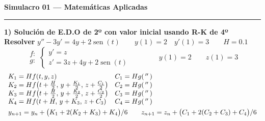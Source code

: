 \documentclass[11pt]{article}
\DeclareMathOperator{\sen}{sen}
\begin{document}
\begin{center}{\Large\textbf{Simulacro 01 --- Matemáticas Aplicadas}}\end{center}
\hrule\vspace{8pt}

{\large\textbf{1) Solución de E.D.O de 2º con valor inicial usando R-K de 4º}}\\[6pt]
\textbf{Resolver} \quad $y''-3y'=4y+2\sen(t) \qquad y(1)=2 \quad y'(1)=3 \qquad H=0.1$\\[4pt]
\[
\begin{array}{r} f:\\[2pt] g:\end{array}\left\{\begin{array}{l} y'=z\\[2pt] z'=3z+4y+2\sen(t)\end{array}\right.
\qquad\qquad y(1)=2 \qquad z(1)=3
\]
\[
\begin{array}{ll}
K_1=Hf(t,y,z) & C_1=Hg(\,''\,)\\
K_2=Hf\!\left(t+\frac{H}{2},\,y+\frac{K_1}{2},\,z+\frac{C_1}{2}\right) & C_2=Hg(\,''\,)\\
K_3=Hf\!\left(t+\frac{H}{2},\,y+\frac{K_2}{2},\,z+\frac{C_2}{2}\right) & C_3=Hg(\,''\,)\\
K_4=Hf(t+H,\,y+K_3,\,z+C_3) & C_4=Hg(\,''\,)\\[4pt]
\multicolumn{2}{l}{y_{n+1}=y_n+\big(K_1+2(K_2+K_3)+K_4\big)/6 \qquad z_{n+1}=z_n+\big(C_1+2(C_2+C_3)+C_4\big)/6}
\end{array}
\]
{\small
}
\end{document}
